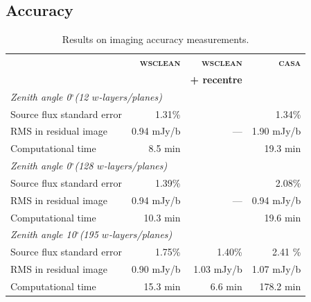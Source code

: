 \documentclass[useAMS,usenatbib]{mn2e}
\newcommand{\degree}{\ensuremath{^{\circ}}\xspace}
\begin{document}
\subsection{Accuracy}
\begin{table}%
\caption{Results on imaging accuracy measurements.} \label{tbl:accuracy-measurements}%
\begin{center}\begin{tabular}{lrrr}%
\hline\hline
& \textbf{\textsc{wsclean}} & \textbf{\textsc{wsclean}}    & \textbf{\textsc{casa}} \\
&                  & \textbf{+ recentre} & \\
\hline
\multicolumn{3}{l}{\textit{Zenith angle 0\degree (12 $w$-layers/planes)}} \\
\hline
Source flux standard error & 1.31\% & & 1.34\% \\
RMS in residual image & 0.94 mJy/b & --- & 1.90 mJy/b\\
Computational time & 8.5 min & & 19.3 min\\
\hline
\multicolumn{3}{l}{\textit{Zenith angle 0\degree (128 $w$-layers/planes)}} \\
\hline
Source flux standard error & 1.39\% & & 2.08\% \\
RMS in residual image & 0.94 mJy/b & --- & 0.94 mJy/b \\
Computational time & 10.3 min & & 19.6 min \\
\hline
\multicolumn{3}{l}{\textit{Zenith angle 10\degree (195 $w$-layers/planes)}} \\
\hline
Source flux standard error & 1.75\% & 1.40\% & 2.41 \%\\
RMS in residual image & 0.90 mJy/b & 1.03 mJy/b & 1.07 mJy/b \\
Computational time & 15.3 min & 6.6 min & 178.2 min \\
\hline\hline
\end{tabular}\end{center}\end{table}
\end{document}
